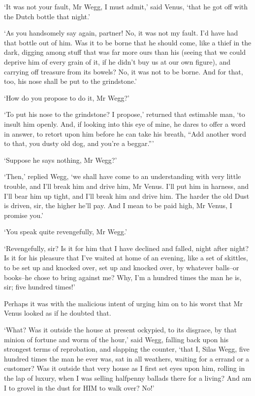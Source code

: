 ‘It was not your fault, Mr Wegg, I must admit,’ said Venus, ‘that he got
off with the Dutch bottle that night.’

‘As you handsomely say again, partner! No, it was not my fault. I’d have
had that bottle out of him. Was it to be borne that he should come, like
a thief in the dark, digging among stuff that was far more ours than his
(seeing that we could deprive him of every grain of it, if he didn’t buy
us at our own figure), and carrying off treasure from its bowels? No,
it was not to be borne. And for that, too, his nose shall be put to the
grindstone.’

‘How do you propose to do it, Mr Wegg?’

‘To put his nose to the grindstone? I propose,’ returned that estimable
man, ‘to insult him openly. And, if looking into this eye of mine, he
dares to offer a word in answer, to retort upon him before he can take
his breath, “Add another word to that, you dusty old dog, and you’re a
beggar.”’

‘Suppose he says nothing, Mr Wegg?’

‘Then,’ replied Wegg, ‘we shall have come to an understanding with very
little trouble, and I’ll break him and drive him, Mr Venus. I’ll put
him in harness, and I’ll bear him up tight, and I’ll break him and drive
him. The harder the old Dust is driven, sir, the higher he’ll pay. And I
mean to be paid high, Mr Venus, I promise you.’

‘You speak quite revengefully, Mr Wegg.’

‘Revengefully, sir? Is it for him that I have declined and falled,
night after night? Is it for his pleasure that I’ve waited at home of an
evening, like a set of skittles, to be set up and knocked over, set up
and knocked over, by whatever balls--or books--he chose to bring against
me? Why, I’m a hundred times the man he is, sir; five hundred times!’

Perhaps it was with the malicious intent of urging him on to his worst
that Mr Venus looked as if he doubted that.

‘What? Was it outside the house at present ockypied, to its disgrace,
by that minion of fortune and worm of the hour,’ said Wegg, falling back
upon his strongest terms of reprobation, and slapping the counter,
‘that I, Silas Wegg, five hundred times the man he ever was, sat in all
weathers, waiting for a errand or a customer? Was it outside that very
house as I first set eyes upon him, rolling in the lap of luxury, when I
was selling halfpenny ballads there for a living? And am I to grovel in
the dust for HIM to walk over? No!’

